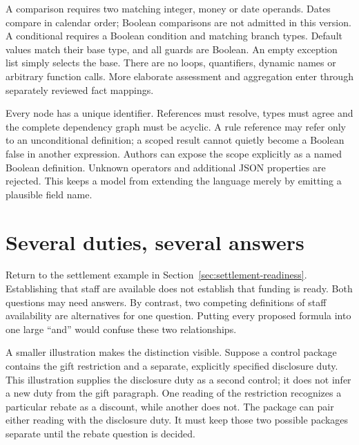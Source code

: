 \documentclass[12pt,a4paper,oneside,openany]{book}
\begin{document}
A comparison requires two matching integer, money or date operands. Dates
compare in calendar order; Boolean comparisons are not admitted in this version.
A conditional requires a Boolean condition and matching branch types. Default
values match their base type, and all guards are Boolean. An empty exception
list simply selects the base. There are no loops, quantifiers, dynamic names or
arbitrary function calls. More elaborate assessment and aggregation enter
through separately reviewed fact mappings.

Every node has a unique identifier. References must resolve, types must agree
and the complete dependency graph must be acyclic. A rule reference may refer
only to an unconditional definition; a scoped result cannot quietly become a
Boolean false in another expression. Authors can expose the scope explicitly
as a named Boolean definition. Unknown operators and additional JSON properties
are rejected. This keeps a model from extending the language merely by emitting
a plausible field name.

\section{Several duties, several answers}
\label{sec:control-composition}

Return to the settlement example in Section~\ref{sec:settlement-readiness}.
Establishing that staff are available does not establish that funding is ready.
Both questions may need answers. By contrast, two competing definitions of
staff availability are alternatives for one question. Putting every proposed
formula into one large ``and'' would confuse these two relationships.

A smaller illustration makes the distinction visible. Suppose a control package
contains the gift restriction and a separate, explicitly specified disclosure
duty. This illustration supplies the disclosure duty as a second control; it
does not infer a new duty from the gift paragraph. One reading of the restriction
recognizes a particular rebate as a discount, while another does not. The
package can pair either reading with the disclosure duty. It must keep those
two possible packages separate until the rebate question is decided.
\end{document}
